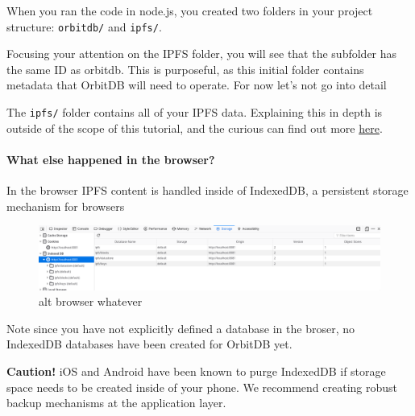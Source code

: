 When you ran the code in node.js, you created two folders in your
project structure: \texttt{\textquotesingle{}orbitdb/} and
\texttt{ipfs/}.

\begin{Shaded}
\begin{Highlighting}[]
\NormalTok{$ }
\NormalTok{$ }

\NormalTok{$ }
\end{Highlighting}
\end{Shaded}

Focusing your attention on the IPFS folder, you will see that the
subfolder has the same ID as orbitdb. This is purposeful, as this
initial folder contains metadata that OrbitDB will need to operate. For
now let's not go into detail

The \texttt{ipfs/} folder contains all of your IPFS data. Explaining
this in depth is outside of the scope of this tutorial, and the curious
can find out more \protect\hyperlink{}{here}.

\paragraph{What else happened in the
browser?}\label{what-else-happened-in-the-browser}

In the browser IPFS content is handled inside of IndexedDB, a persistent
storage mechanism for browsers

\hypertarget{}{
\begin{figure}
\centering
\includegraphics{../images/ipfs_browser.png}
\caption{alt browser whatever}
\end{figure}
}

Note since you have not explicitly defined a database in the broser, no
IndexedDB databases have been created for OrbitDB yet.

\textbf{Caution!} iOS and Android have been known to purge IndexedDB if
storage space needs to be created inside of your phone. We recommend
creating robust backup mechanisms at the application layer.

